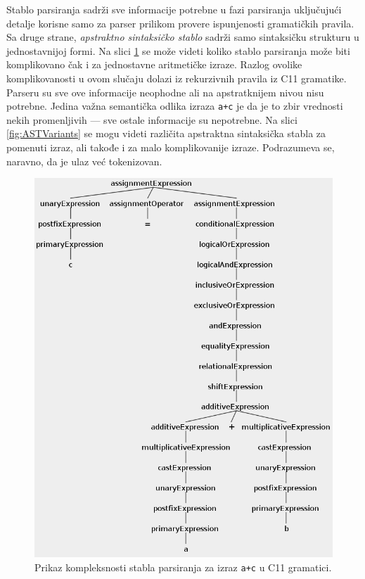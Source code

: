 Stablo parsiranja sadrži sve informacije potrebne u fazi parsiranja uključujući detalje korisne samo za parser prilikom provere ispunjenosti gramatičkih pravila. Sa druge strane, \emph{apstraktno sintaksičko stablo} sadrži samo sintaksičku strukturu u jednostavnijoj formi. Na slici \ref{fig:CompilationProcessPars1} se može videti koliko stablo parsiranja može biti komplikovano čak i za jednostavne aritmetičke izraze. Razlog ovolike komplikovanosti u ovom slučaju dolazi iz rekurzivnih pravila iz C11 gramatike. Parseru su sve ove informacije neophodne ali na apstratknijem nivou nisu potrebne. Jedina važna semantička odlika izraza \texttt{a+c} je da je to zbir vrednosti nekih promenljivih --- sve ostale informacije su nepotrebne. Na slici \ref{fig:ASTVariants} se mogu videti različita apstraktna sintaksička stabla za pomenuti izraz, ali takođe i za malo komplikovanije izraze. Podrazumeva se, naravno, da je ulaz već tokenizovan. 

\begin{figure}[h!]
\centering
\includegraphics[scale=0.55]{images/parse_tree_expr.png}
\caption{Prikaz kompleksnosti stabla parsiranja za izraz 
\texttt{a+c} u C11 gramatici.} 
\label{fig:CompilationProcessPars1}
\end{figure}


